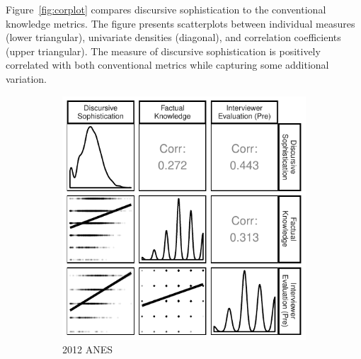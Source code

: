\documentclass[12pt]{article}
\begin{document}

Figure~\ref{fig:corplot} compares discursive sophistication to the conventional knowledge metrics. The figure presents scatterplots between individual measures (lower triangular), univariate densities (diagonal), and correlation coefficients (upper triangular). The measure of discursive sophistication is positively correlated with both conventional metrics while capturing some additional variation.

\begin{figure}[t!]
    \centering
    \begin{subfigure}[t]{0.5\textwidth}
        \centering
        \includegraphics{../fig/corplot_pres2012.pdf}
        \caption{2012 ANES}
    \end{subfigure}%
    ~ 
    \begin{subfigure}[t]{0.5\textwidth}
        \centering

\end{subfigure}
\end{figure}
\end{document}
